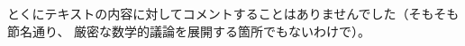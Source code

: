 \documentclass[C:/math/note-logic-intro/note]{subfiles}
\begin{document}
とくにテキストの内容に対してコメントすることはありませんでした（そもそも節名通り、
厳密な数学的議論を展開する箇所でもないわけで）。
\end{document}
